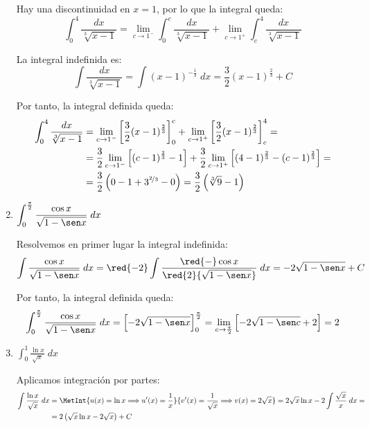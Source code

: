 \begin{ejercicio}
\begin{enumerate}
    Hay una discontinuidad en $x=1$, por lo que la integral queda:
    \begin{equation*}
        \int_{0}^{4} \frac{dx}{\sqrt[3]{x-1}} = \lim_{c\to 1^-}\int_{0}^{c} \frac{dx}{\sqrt[3]{x-1}} + \lim_{c\to 1^+}\int_{c}^{4} \frac{dx}{\sqrt[3]{x-1}}
    \end{equation*}

    La integral indefinida es:
    \begin{equation*}
        \int \frac{dx}{\sqrt[3]{x-1}} = \int (x-1)^{-\frac{1}{3}}\;dx = \frac{3}{2}(x-1)^{\frac{2}{3}}+C
    \end{equation*}

    Por tanto, la integral definida queda:
    \begin{align*}
        \int_{0}^{4} \frac{dx}{\sqrt[3]{x-1}} &= \lim_{c\to 1^-}\left[\frac{3}{2}(x-1)^{\frac{2}{3}}\right]_{0}^{c} + \lim_{c\to 1^+}\left[\frac{3}{2}(x-1)^{\frac{2}{3}}\right]_{c}^{4} =\\
        &= \frac{3}{2} \lim_{c\to 1^-}\left[(c-1)^{\frac{2}{3}}-1\right] + \frac{3}{2} \lim_{c\to 1^+}\left[(4-1)^{\frac{2}{3}}-(c-1)^{\frac{2}{3}}\right] =\\
        &= \frac{3}{2} \left(0-1+3^{\nicefrac{2}{3}}-0\right)= \frac{3}{2}\left(\sqrt[3]{9}-1\right)
    \end{align*}

    \item $\displaystyle \int_{0}^{\frac{\pi}{2}} \frac{\cos x}{{\sqrt{1-\sen x}}}\;dx$
    
    Resolvemos en primer lugar la integral indefinida:
    \begin{equation*}
        \int \frac{\cos x}{{\sqrt{1-\sen x}}}\;dx
        = \red{-2} \int \frac{\red{-}\cos x}{\red{2}{\sqrt{1-\sen x}}}\;dx
        = -2\sqrt{1-\sen x}+C
    \end{equation*}

    Por tanto, la integral definida queda:
    \begin{equation*}
        \int_{0}^{\frac{\pi}{2}} \frac{\cos x}{{\sqrt{1-\sen x}}}\;dx
        = \left[-2\sqrt{1-\sen x}\right]_{0}^{\frac{\pi}{2}}
        = \lim_{c\to \frac{\pi}{2}}\left[-2\sqrt{1-\sen c}+2\right]
        = 2
    \end{equation*}

    \item $\displaystyle \int_{0}^{1} \frac{\ln x}{\sqrt{x}}\;dx$
    
    Aplicamos integración por partes:
    \begin{align*}
        \int \frac{\ln x}{\sqrt{x}}\;dx
        &= \MetInt{u(x)=\ln x \Longrightarrow u'(x)=\frac{1}{x}}{v'(x)=\frac{1}{\sqrt{x}} \Longrightarrow v(x)=2\sqrt{x}}
        = 2\sqrt{x}\ln x - 2\int \frac{\sqrt{x}}{x}\;dx =\\
        &= 2\left(\sqrt{x}\ln x - 2\sqrt{x}\right) + C
    \end{align*}


\end{enumerate}
\end{ejercicio}
